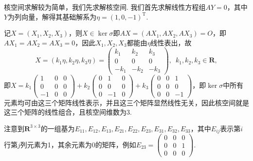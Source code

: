 \begin{solution}
    核空间求解较为简单，我们先求解核空间. 我们首先求解线性方程组$AY=0$，其中$Y$为列向量，解得其基础解系为$\eta=(1,0,-1)^\mathrm{T}$.

    记$X=(X_1,X_2,X_3)$，则$X\in\ker\sigma$即$AX=(AX_1,AX_2,AX_3)=O$，即$AX_1=AX_2=AX_3=0$，因此$X_1,X_2,X_3$都能由$\eta$线性表出，故
    \[X=(k_1\eta,k_2\eta,k_3\eta)=\begin{pmatrix}
            k_1 & k_2 & k_3 \\ 0 & 0 & 0 \\ -k_1 & -k_2 & -k_3
        \end{pmatrix},\enspace k_1,k_2,k_3\in\mathbf{R},\]
    即$X=k_1\begin{pmatrix}
        1 & 0 & 0 \\ 0 & 0 & 0 \\ -1 & 0 & 0
    \end{pmatrix}+k_2\begin{pmatrix}
        0 & 1 & 0 \\ 0 & 0 & 0 \\ 0 & -1 & 0
    \end{pmatrix}+k_3\begin{pmatrix}
        0 & 0 & 1 \\ 0 & 0 & 0 \\ 0 & 0 & -1
    \end{pmatrix}$，即$\ker\sigma$中所有元素均可由这三个矩阵线性表示，并且这三个矩阵显然线性无关，因此核空间就是这三个矩阵的线性组合，且核空间维数为3.

    注意到$\mathbf{R}^{3 \times 3}$的一组基为$E_{11},E_{12},E_{13},E_{21},E_{22},E_{23},E_{31},E_{32},E_{33}$，其中$E_{ij}$表示第$i$行第$j$列元素为1，其余元素为0的矩阵，例如$E_{23}=\begin{pmatrix}
            0 & 0 & 0 \\ 0 & 0 & 1 \\ 0 & 0 & 0
        \end{pmatrix}$.


\end{solution}
